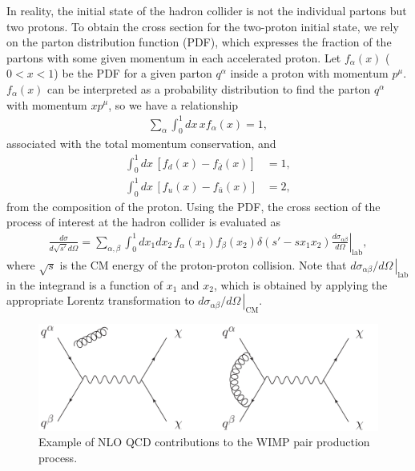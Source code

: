 \documentclass[12pt,twoside,book]{article}
\begin{document}
In reality, the initial state of the hadron collider is not the individual partons but two protons.
To obtain the cross section for the two-proton initial state, we rely on the parton distribution function (PDF), which expresses the fraction of the partons with some given momentum in each accelerated proton.
Let $f_\alpha (x)$ ($0 < x < 1$) be the PDF for a given parton $q^\alpha$ inside a proton with momentum $p^\mu$.
$f_\alpha (x)$ can be interpreted as a probability distribution to find the parton $q^\alpha$ with momentum $x p^\mu$, so we have a relationship
\begin{align}
  \sum_\alpha \int_0^1 dx \, x f_\alpha (x) = 1,
\end{align}
associated with the total momentum conservation, and
\begin{align}
  \int_0^1 dx \, \left[ f_d (x) - f_{\bar{d}} (x) \right] &= 1,\\
  \int_0^1 dx \, \left[ f_u (x) - f_{\bar{u}} (x) \right] &= 2,
\end{align}
from the composition of the proton.
Using the PDF, the cross section of the process of interest at the hadron collider is evaluated as
\begin{align}
  \frac{d \sigma}{d \sqrt{s'} d \Omega} =
  \sum_{\alpha, \beta} \int_0^1 dx_1 dx_2 \, f_\alpha (x_1) f_\beta (x_2) \delta \left( s' - s x_1 x_2 \right)
  \left. \frac{d \sigma_{\alpha \beta}}{d \Omega} \right|_{\text{lab}},
\end{align}
where $\sqrt{s}$ is the CM energy of the proton-proton collision.
Note that $\left. d \sigma_{\alpha \beta} / d \Omega\, \right|_{\text{lab}}$ in the integrand is a function of $x_1$ and $x_2$, which is obtained by applying the appropriate Lorentz transformation to $\left. d \sigma_{\alpha \beta} / d \Omega\, \right|_{\text{CM}}$.


\begin{figure}[t]
  \centering
  \includegraphics[width=0.8\hsize]{WIMP_production_NLO.pdf}
  \caption{Example of NLO QCD contributions to the WIMP pair production process.}
  \label{fig:WIMP_production_NLO}
\end{figure}
\end{document}
